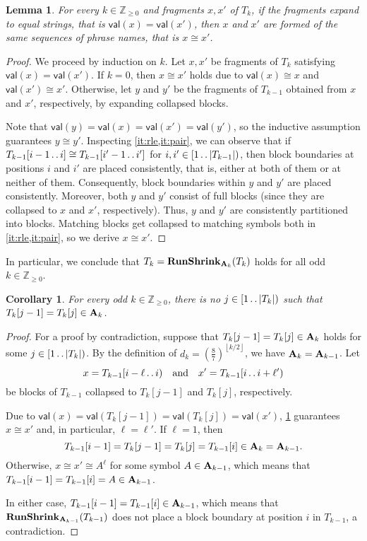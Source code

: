 \documentclass[a4paper]{article}
\newtheorem{lemma}[theorem]{Lemma}
\newtheorem{corollary}[theorem]{Corollary}
\theoremstyle{definition}
\theoremstyle{remark}
\newcommand{\Zz}{\mathbb{Z}_{\ge 0}}
\newcommand{\floor}[1]{\left\lfloor #1 \right\rfloor}
\newcommand{\dd}{\mathinner{\ldotp\ldotp}}
\newcommand{\val}{\mathsf{val}}
\newcommand{\osiemsiedem}{\left(\tfrac{8}{7}\right)}
\begin{document}
\begin{lemma}\label{fct:cons}
For every $k\in \Zz$ and fragments $x,x'$ of $T_k$, if the fragments expand to equal strings, that is $\val(x)=\val(x')$,
then $x$ and $x'$ are formed of the same sequences of phrase names, that is $x \cong x'$.
\end{lemma} 
\begin{proof}
We proceed by induction on $k$. 
Let $x,x'$ be fragments of $T_{k}$ satisfying $\val(x)=\val(x')$.
If $k=0$, then $x\cong x'$ holds due to $\val(x)\cong x$ and $\val(x')\cong x'$.
Otherwise, let $y$ and $y'$ be the fragments of $T_{k-1}$ obtained from $x$ and $x'$, respectively, by expanding collapsed blocks.

Note that $\val(y)=\val(x)=\val(x')=\val(y')$, so the inductive assumption guarantees $y\cong y'$.
Inspecting \cref{it:rle,it:pair}, we can observe that if $T_{k-1}[i-1\dd i]\cong T_{k-1}[i'-1\dd i']$ for $i,i'\in [1\dd |T_{k-1}|)$,
then block boundaries at positions $i$ and $i'$ are placed consistently, that is,
either at both of them or at neither of them.
Consequently, block boundaries within $y$ and $y'$ are placed consistently.
Moreover, both $y$ and $y'$ consist of full blocks (since they are collapsed to $x$ and $x'$, respectively). Thus, $y$ and $y'$ are consistently partitioned into blocks. 
Matching blocks get collapsed to matching symbols both in \cref{it:rle,it:pair}, so we derive $x\cong x'$.
\end{proof}

In particular, we conclude that $T_{k}=\mathsf{\mathbf{RunShrink}}_{\mathbf{A}_{k}}(T_{k})$ holds for all odd $k\in \Zz$.
\begin{corollary}\label{cor:distinct}
  For every odd $k\in \Zz$, there is no $j\in [1\dd |T_k|)$ such that $T_k[j-1]=T_k[j]\in \mathbf{A}_{k}$.
  \end{corollary}
  \begin{proof}
    For a proof by contradiction, suppose that $T_k[j-1]=T_k[j]\in  \mathbf{A}_{k}$ holds for some $j\in [1\dd |T_k|)$.
    By the definition of $d_k=\osiemsiedem^{\floor{k/2}}$, we have $\mathbf{A}_k=\mathbf{A}_{k-1}$.
  Let \[x=T_{k-1}[i-\ell\dd i)\quad \text{and}\quad x'=T_{k-1}[i\dd i+\ell')\] be 
blocks of $T_{k-1}$ collapsed to $T_k[j-1]$ and $T_k[j]$, respectively. 

Due to $\val(x)=\val(T_k[j-1])=\val(T_k[j])=\val(x')$, \cref{fct:cons} guarantees $x \cong x'$ and, in particular, $\ell=\ell'$.
    If $\ell=1$, then \[T_{k-1}[i-1]=T_k[j-1]=T_k[j]=T_{k-1}[i] \in \mathbf{A}_{k}=\mathbf{A}_{k-1}.\]
Otherwise, $x\cong x' \cong A^\ell$ for some symbol $A\in \mathbf{A}_{k-1}$,
    which means that $T_{k-1}[i-1]=T_{k-1}[i]=A\in \mathbf{A}_{k-1}$.

In either case, $T_{k-1}[i-1]=T_{k-1}[i]\in \mathbf{A}_{k-1}$, which means that $\mathsf{\mathbf{RunShrink}}_{\mathbf{A}_{k-1}}(T_{k-1})$ does not place a block
    boundary at position $i$ in $T_{k-1}$, a contradiction.
  \end{proof}
\end{document}

